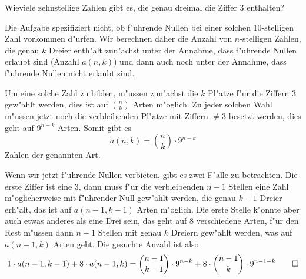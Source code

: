 Wieviele zehnstellige Zahlen gibt es, die genau dreimal die Ziffer
3 enthalten?

\begin{loesung}
Die Aufgabe spezifiziert nicht, ob f"uhrende Nullen bei einer solchen
10-stelligen Zahl
vorkommen d"urfen. Wir berechnen daher die Anzahl von $n$-stelligen
Zahlen, die genau $k$ Dreier enth"alt zun"achst unter der Annahme,
dass f"uhrende Nullen erlaubt sind (Anzahl $a(n,k)$) und dann auch
noch unter der Annahme, dass f"uhrende Nullen nicht erlaubt sind.

Um eine solche Zahl zu bilden, m"ussen zun"achst die $k$ Pl"atze
f"ur die Ziffern 3 gew"ahlt werden, dies ist auf $\binom{n}{k}$
Arten m"oglich. Zu jeder solchen Wahl m"ussen jetzt noch die
verbleibenden Pl"atze mit Ziffern $\ne 3$ besetzt werden, dies
geht auf $9^{n-k}$ Arten. Somit gibt es
$$a(n,k)=\binom{n}{k}\cdot9^{n-k}$$
Zahlen der genannten Art.

Wenn wir jetzt f"uhrende Nullen verbieten, gibt es zwei F"alle zu
betrachten. Die erste Ziffer ist eine $3$, dann muss f"ur die
verbleibenden $n-1$ Stellen eine Zahl m"oglicherweise mit f"uhrender
Null gew"ahlt werden, die genau $k-1$ Dreier erh"alt, das ist auf $a(n-1,k-1)$
Arten m"oglich. Die erste Stelle k"onnte aber auch etwas anderes
als eine Drei sein, das geht auf $8$ verschiedene Arten, f"ur den
Rest m"ussen dann $n-1$ Stellen mit genau $k$ Dreiern gew"ahlt
werden, was auf $a(n-1,k)$ Arten geht. Die gesuchte Anzahl ist also
\[
1\cdot a(n-1,k-1) + 8\cdot a(n-1,k)=
\binom{n-1}{k-1}\cdot 9^{n-k}+8\cdot\binom{n-1}{k}\cdot 9^{n-1-k}
\qedhere
\]
\end{loesung}

